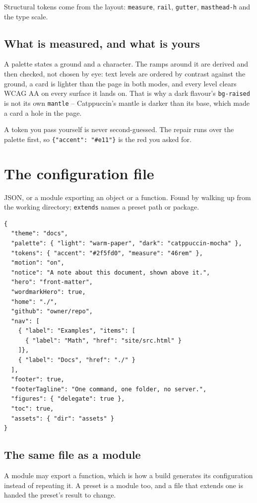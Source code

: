 \documentclass[11pt]{article}
\begin{document}
Structural tokens come from the layout: \texttt{measure}, \texttt{rail},
\texttt{gutter}, \texttt{masthead-h} and the type scale.

\subsection{What is measured, and what is yours}

A palette states a ground and a character. The ramps around it are derived and
then
checked, not chosen by eye: text levels are ordered by contrast against the
ground, a card is lighter than the page in both modes, and every level clears
WCAG AA on
every surface it lands on. That is why a dark flavour's \texttt{bg-raised} is
not
its own \texttt{mantle} -- Catppuccin's mantle is darker than its base, which
made a card a hole in the page.

A token you pass yourself is never second-guessed. The repair runs over the
palette first, so \texttt{\{"accent": "\#e11"\}} is the red you asked for.

\section{The configuration file}

JSON, or a module exporting an object or a function. Found by walking up from
the working directory; \texttt{extends} names a preset path or package.

\begin{verbatim}
{
  "theme": "docs",
  "palette": { "light": "warm-paper", "dark": "catppuccin-mocha" },
  "tokens": { "accent": "#2f5fd0", "measure": "46rem" },
  "motion": "on",
  "notice": "A note about this document, shown above it.",
  "hero": "front-matter",
  "wordmarkHero": true,
  "home": "./",
  "github": "owner/repo",
  "nav": [
    { "label": "Examples", "items": [
      { "label": "Math", "href": "site/src.html" }
    ]},
    { "label": "Docs", "href": "./" }
  ],
  "footer": true,
  "footerTagline": "One command, one folder, no server.",
  "figures": { "delegate": true },
  "toc": true,
  "assets": { "dir": "assets" }
}
\end{verbatim}

\subsection{The same file as a module}

A module may export a function, which is how a build generates its configuration
instead of repeating it. A preset is a module too, and a file that extends one
is handed the preset's result to change.
\end{document}
